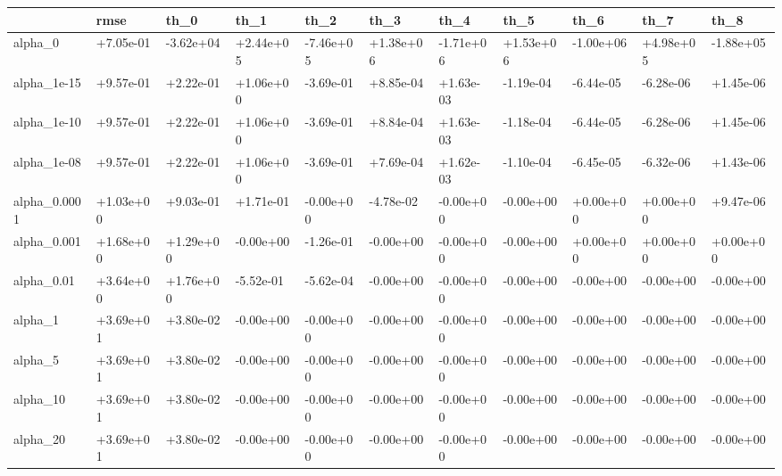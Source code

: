 \begin{tabular}{lllllllllll}
\toprule
{} &      rmse &      th\_0 &      th\_1 &      th\_2 &      th\_3 &      th\_4 &      th\_5 &      th\_6 &      th\_7 &      th\_8 \\
\midrule
alpha\_0      & +7.05e-01 & -3.62e+04 & +2.44e+05 & -7.46e+05 & +1.38e+06 & -1.71e+06 & +1.53e+06 & -1.00e+06 & +4.98e+05 & -1.88e+05 \\
alpha\_1e-15  & +9.57e-01 & +2.22e-01 & +1.06e+00 & -3.69e-01 & +8.85e-04 & +1.63e-03 & -1.19e-04 & -6.44e-05 & -6.28e-06 & +1.45e-06 \\
alpha\_1e-10  & +9.57e-01 & +2.22e-01 & +1.06e+00 & -3.69e-01 & +8.84e-04 & +1.63e-03 & -1.18e-04 & -6.44e-05 & -6.28e-06 & +1.45e-06 \\
alpha\_1e-08  & +9.57e-01 & +2.22e-01 & +1.06e+00 & -3.69e-01 & +7.69e-04 & +1.62e-03 & -1.10e-04 & -6.45e-05 & -6.32e-06 & +1.43e-06 \\
alpha\_0.0001 & +1.03e+00 & +9.03e-01 & +1.71e-01 & -0.00e+00 & -4.78e-02 & -0.00e+00 & -0.00e+00 & +0.00e+00 & +0.00e+00 & +9.47e-06 \\
alpha\_0.001  & +1.68e+00 & +1.29e+00 & -0.00e+00 & -1.26e-01 & -0.00e+00 & -0.00e+00 & -0.00e+00 & +0.00e+00 & +0.00e+00 & +0.00e+00 \\
alpha\_0.01   & +3.64e+00 & +1.76e+00 & -5.52e-01 & -5.62e-04 & -0.00e+00 & -0.00e+00 & -0.00e+00 & -0.00e+00 & -0.00e+00 & -0.00e+00 \\
alpha\_1      & +3.69e+01 & +3.80e-02 & -0.00e+00 & -0.00e+00 & -0.00e+00 & -0.00e+00 & -0.00e+00 & -0.00e+00 & -0.00e+00 & -0.00e+00 \\
alpha\_5      & +3.69e+01 & +3.80e-02 & -0.00e+00 & -0.00e+00 & -0.00e+00 & -0.00e+00 & -0.00e+00 & -0.00e+00 & -0.00e+00 & -0.00e+00 \\
alpha\_10     & +3.69e+01 & +3.80e-02 & -0.00e+00 & -0.00e+00 & -0.00e+00 & -0.00e+00 & -0.00e+00 & -0.00e+00 & -0.00e+00 & -0.00e+00 \\
alpha\_20     & +3.69e+01 & +3.80e-02 & -0.00e+00 & -0.00e+00 & -0.00e+00 & -0.00e+00 & -0.00e+00 & -0.00e+00 & -0.00e+00 & -0.00e+00 \\
\bottomrule
\end{tabular}

